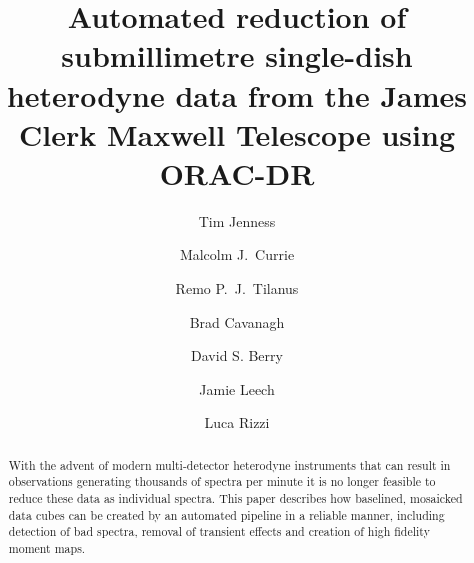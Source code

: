 \documentclass[final,authoryear,5p,times,twocolumn]{elsarticle}
\begin{document}
\begin{frontmatter}



\title{Automated reduction of submillimetre single-dish heterodyne
  data from the James Clerk Maxwell Telescope using ORAC-DR}


\author[jac,cornell]{Tim Jenness}
\author[jac]{Malcolm J.\ Currie}
\author[jac]{Remo P.\ J.\ Tilanus}
\author[jac]{Brad Cavanagh}
\author[jac]{David S. Berry}
\author[jac]{Jamie Leech}
\author[jac]{Luca Rizzi}


\address[jac]{Joint Astronomy Centre, 660 N.\ A`oh\=ok\=u Place, Hilo, HI
  96720, USA}
\address[cornell]{Department of Astronomy, Cornell University, Ithaca,
  NY 14853, USA}

\begin{abstract}

With the advent of modern multi-detector heterodyne instruments that
can result in observations generating thousands of spectra per minute it is
no longer feasible to reduce these data as individual spectra. This
paper describes how baselined, mosaicked data cubes can be created by
an automated pipeline in a reliable manner, including detection of bad
spectra, removal of transient effects and creation of high fidelity
moment maps.


\end{abstract}
\end{frontmatter}
\end{document}

